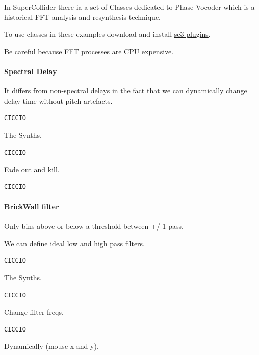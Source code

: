 In SuperCollider there ia a set of Classes dedicated to Phase Vocoder which is a historical FFT analysis and resynthesis technique.

To use classes in these examples download and install \href{https://supercollider.github.io/sc3-plugins/}{sc3-plugins}.

Be careful because FFT processes are CPU expensive.

\paragraph{Spectral Delay}\label{spectral-delay}

It differs from non-spectral delays in the fact that we can dynamically change delay time without pitch artefacts.

\begin{lstlisting}[frame=single] 
CICCIO
\end{lstlisting}

The Synths.

\begin{lstlisting}[frame=single] 
CICCIO
\end{lstlisting}

Fade out and kill.

\begin{lstlisting}[frame=single] 
CICCIO
\end{lstlisting}

\paragraph{BrickWall filter}\label{brickwall-filter}

Only bins above or below a threshold between +/-1 pass.

We can define ideal low and high pass filters.

\begin{lstlisting}[frame=single] 
CICCIO
\end{lstlisting}

The Synths.

\begin{lstlisting}[frame=single] 
CICCIO
\end{lstlisting}

Change filter freqs.

\begin{lstlisting}[frame=single] 
CICCIO
\end{lstlisting}

Dynamically (mouse x and y).

